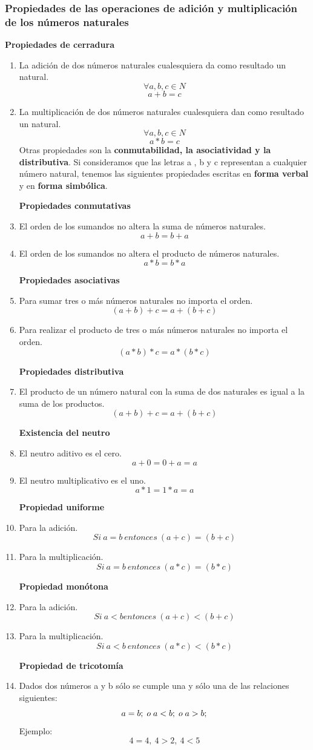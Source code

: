 \documentclass{article}
\begin{document}
\subsubsection{Propiedades de las operaciones de adición y multiplicación de los números naturales}
\textbf{Propiedades de cerradura}
\begin{enumerate}
\item{La adición de dos números naturales cualesquiera da como resultado un natural.
\[\forall a,b,c \in N\]
\[a+b=c\]
}
\item{La multiplicación de dos números naturales cualesquiera dan como resultado un natural.
\[\forall a,b,c \in N\]
\[a*b=c\]
}
Otras propiedades son la \textbf{conmutabilidad, la asociatividad y la distributiva}.
Si consideramos que las letras a , b y c representan a cualquier número natural,
tenemos las siguientes propiedades escritas en \textbf{forma verbal} y en \textbf{forma simbólica}.

\textbf{Propiedades conmutativas}
\item{El orden de los sumandos no altera la suma de números naturales.
\[a+b=b+a\]
}
\item{El orden de los sumandos no altera el producto de números naturales.
\[a*b=b*a\]
}

\textbf{Propiedades asociativas}
\item{Para sumar tres o más números naturales no importa el orden.
\[(a+b)+c=a+(b+c)\]
}
\item{Para realizar el producto de tres o más números naturales no importa el orden.
\[(a*b)*c=a*(b*c)\]
}

\textbf{Propiedades distributiva}
\item{El producto de un número natural con la suma de dos naturales es igual a la suma de los productos.
\[(a+b)+c=a+(b+c)\]
}

\textbf{Existencia del neutro}
\item{El neutro aditivo es el cero.
\[a+0=0+a=a\]
}
\item{El neutro multiplicativo es el uno.
\[a*1=1*a=a\]
}

\textbf{Propiedad uniforme}
\item{Para la adición.
\[Si \medspace a=b \medspace entonces \medspace (a+c)=(b+c)\]
}
\item{Para la multiplicación.
\[Si \medspace a=b \medspace entonces \medspace (a*c)=(b*c)\]
}

\textbf{Propiedad monótona}
\item{Para la adición.
\[Si \medspace a<b entonces \medspace (a+c)<(b+c)\]
}
\item{Para la multiplicación.
\[Si \medspace a<b \medspace entonces \medspace (a*c)<(b*c)\]
}

\textbf{Propiedad de tricotomía}
\item{Dados dos números a y b  sólo se cumple una y sólo una de las relaciones siguientes:
\[a=b; \thickspace  o \thickspace  a<b; \thickspace  o \thickspace a>b;\]
}
Ejemplo:
\[4=4,  \medspace  4>2, \medspace  4<5\]

\end{enumerate}
\end{document}
